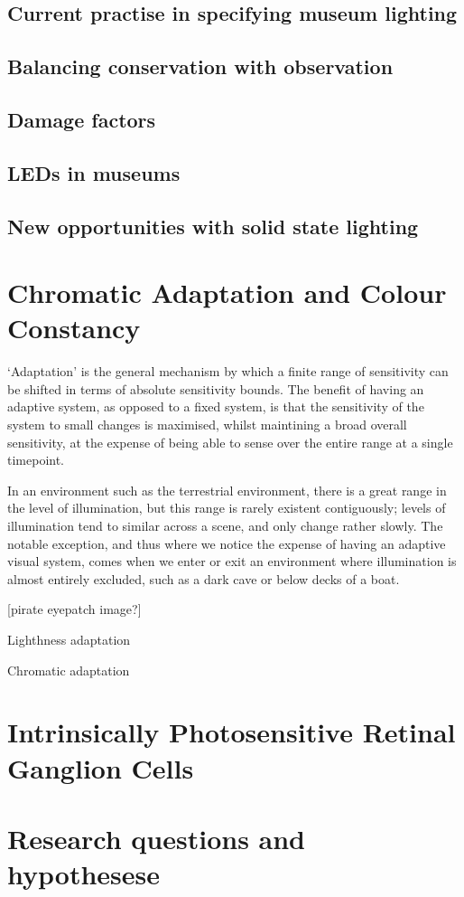 \subsection{Current practise in specifying museum lighting}
\subsection{Balancing conservation with observation}
\subsection{Damage factors}
\subsection{LEDs in museums}
\subsection{New opportunities with solid state lighting}

\section{Chromatic Adaptation and Colour Constancy}
`Adaptation' is the general mechanism by which a finite range of sensitivity can be shifted in terms of absolute sensitivity bounds. The benefit of having an adaptive system, as opposed to a fixed system, is that the sensitivity of the system to small changes is maximised, whilst maintining a broad overall sensitivity, at the expense of being able to sense over the entire range at a single timepoint. 

In an environment such as the terrestrial environment, there is a great range in the level of illumination, but this range is rarely existent contiguously; levels of illumination tend to similar across a scene, and only change rather slowly. The notable exception, and thus where we notice the expense of having an adaptive visual system, comes when we enter or exit an environment where illumination is almost entirely excluded, such as a dark cave or below decks of a boat. 

[pirate eyepatch image?]

Lighthness adaptation

Chromatic adaptation



\section{Intrinsically Photosensitive Retinal Ganglion Cells}
\section{Research questions and hypothesese}
